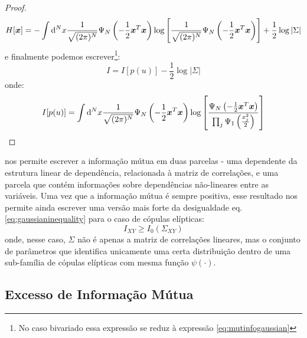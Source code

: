 \begin{proof}
\[
H[\bm{x}] = - \int \mathrm{d}^N x \frac{1}{\sqrt{(2\pi)^N}} \Psi_{N}\left(-\frac{1}{2} \bm{x}^{T}\bm{x}\right) \log\left[\frac{1}{\sqrt{(2\pi)^N}} \Psi_{N}\left(-\frac{1}{2} \bm{x}^{T}\bm{x}\right)\right] + \frac{1}{2}\log|\Sigma|
\]
e finalmente podemos escrever\footnote{No caso bivariado essa expressão se reduz à expressão \ref{eq:mutinfogaussian}}:
\begin{equation}
I = I[p(u)] - \frac{1}{2}\log|\Sigma|
\end{equation}
onde:
\begin{equation}
\label{eq:excesselliptical}
I[p(u)] = \int \ud^N x \frac{1}{\sqrt{(2\pi)^N}} \Psi_{N}\left(-\frac{1}{2} \vec{x}^{T}\vec{x}\right) \log\left[\frac{\Psi_{N}\left(-\frac{1}{2} \vec{x}^{T}\vec{x}\right)}{\prod_j \Psi_{1}\left(\frac{x_j^2}{2}\right)}\right]
\end{equation}
\end{proof}

 nos permite escrever a informação mútua em duas parcelas - uma dependente da estrutura linear de dependência, relacionada à matriz de correlações, e uma parcela que contém informações sobre dependências não-lineares entre as variáveis. Uma vez que a informação mútua é sempre positiva, esse resultado nos permite ainda escrever uma versão mais forte da desigualdade eq.\eqref{eq:gaussianinequality} para o caso de cópulas elípticas:
\begin{equation}
\label{eq:gaussianineqgen}
 I_{XY} \ge I_{0}(\Sigma_{XY})
\end{equation}
onde, nesse caso, $\Sigma$ não é apenas a matriz de correlações lineares, mas o conjunto de parâmetros que identifica unicamente uma certa distribuição dentro de uma sub-família de cópulas elípticas com mesma função $\psi(\cdot)$.

\subsection{Excesso de Informação Mútua}

